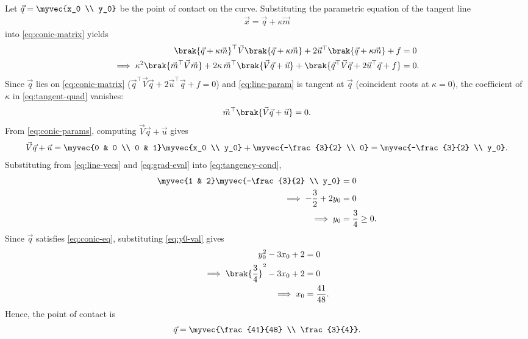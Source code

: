 \begin{enumerate}[label=\thesubsection.\arabic*, ref=\thesubsection.\theenumi]
  Let $\vec{q} = \myvec{x_0 \\ y_0}$ be the point of contact on the curve. Substituting the parametric equation of the tangent line
  \begin{align}
  	\vec{x} = \vec{q} + \kappa \vec{m} \label{eq:line-param}
  \end{align}
  into \eqref{eq:conic-matrix} yields
  \begin{align}
  	\brak{\vec{q} + \kappa \vec{m}}^{\top}\vec{V}\brak{\vec{q} + \kappa \vec{m}} + 2\vec{u}^{\top}\brak{\vec{q} + \kappa \vec{m}} + f &= 0
  	\\
  	\implies \kappa^2\brak{\vec{m}^{\top}\vec{V}\vec{m}} + 2\kappa\,\vec{m}^{\top}\brak{\vec{V}\vec{q} + \vec{u}} + \brak{\vec{q}^{\top}\vec{V}\vec{q} + 2\vec{u}^{\top}\vec{q} + f} &= 0. \label{eq:tangent-quad}
  \end{align}
  Since $\vec{q}$ lies on \eqref{eq:conic-matrix} ($\vec{q}^{\top}\vec{V}\vec{q} + 2\vec{u}^{\top}\vec{q} + f = 0$) and \eqref{eq:line-param} is tangent at $\vec{q}$ (coincident roots at $\kappa = 0$), the coefficient of $\kappa$ in \eqref{eq:tangent-quad} vanishes:
  \begin{align}
  	\vec{m}^{\top}\brak{\vec{V}\vec{q} + \vec{u}} = 0. \label{eq:tangency-cond}
  \end{align}
  From \eqref{eq:conic-params}, computing $\vec{V}\vec{q} + \vec{u}$ gives
  \begin{align}
  	\vec{V}\vec{q} + \vec{u} = \myvec{0 & 0 \\ 0 & 1}\myvec{x_0 \\ y_0} + \myvec{-\frac{3}{2} \\ 0} = \myvec{-\frac{3}{2} \\ y_0}. \label{eq:grad-eval}
  \end{align}
  Substituting from \eqref{eq:line-vecs} and \eqref{eq:grad-eval} into \eqref{eq:tangency-cond},
  \begin{align}
  	\myvec{1 & 2}\myvec{-\frac{3}{2} \\ y_0} &= 0
  	\\
  	\implies -\frac{3}{2} + 2y_0 &= 0
  	\\
  	\implies y_0 &= \frac{3}{4} \ge 0. \label{eq:y0-val}
  \end{align}
  Since $\vec{q}$ satisfies \eqref{eq:conic-eq}, substituting \eqref{eq:y0-val} gives
  \begin{align}
  	y_0^2 - 3x_0 + 2 &= 0
  	\\
  	\implies \brak{\frac{3}{4}}^2 - 3x_0 + 2 &= 0
  	\\
  	\implies x_0 &= \frac{41}{48}.
  \end{align}
  Hence, the point of contact is
  \begin{align}
  	\vec{q} = \myvec{\frac{41}{48} \\ \frac{3}{4}}. \label{eq:contact-point}
  \end{align}
  

\end{enumerate}
